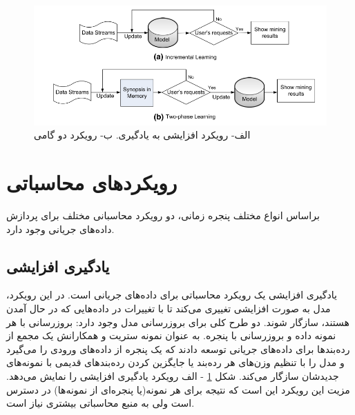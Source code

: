 \begin{figure}%
\centerline{\includegraphics[width=15cm]{approach}}
\caption{الف- رویکرد افزایشی به یادگیری. ب- رویکرد دو گامی}
\label{fig:approach}
\end{figure}


\section{رویکردهای محاسباتی}

براساس انواع مختلف پنجره زمانی، دو رویکرد محاسبانی مختلف برای پردازش داده‌های جریانی وجود دارد.

\subsection{یادگیری افزایشی}
یادگیری افزایشی یک رویکرد محاسباتی برای داده‌های جریانی است\cite{seidl2009indexing}. در این رویکرد، مدل به صورت افزایشی تغییری می‌کند تا با تغییرات در داده‌هایی که در حال آمدن هستند، سازگار شوند. دو طرح کلی برای بروزرسانی مدل وجود دارد: بروزرسانی با هر نمونه داده و بروزرسانی با پنجره. به عنوان نمونه ستریت
و همکارانش \cite{street2001streaming}یک مجمع از رده‌بندها برای داده‌های جریانی توسعه‌ دادند که یک پنجره از داده‌های ورودی را می‌گیرد و مدل را با تنظیم وزن‌های هر رده‌بند یا جایگزین کردن رده‌بند‌های قدیمی با نمونه‌های جدیدشان سازگار می‌کند. شکل
\ref{fig:approach}
- الف رویکرد یادگیری افزایشی را نمایش می‌دهد. مزیت این رویکرد این است که نتیجه برای هر نمونه(یا پنجره‌ای از نمونه‌ها) در دسترس است ولی به منبع محاسباتی بیشتری نیاز است.

